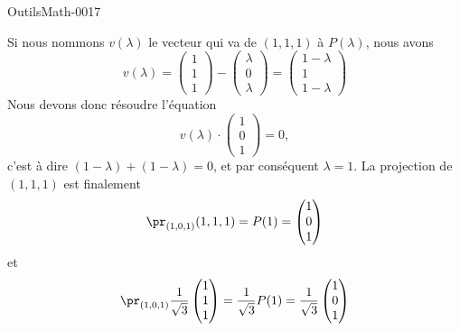 \begin{corrige}{OutilsMath-0017}
	
	Si nous nommons $v(\lambda)$ le vecteur qui va de $(1,1,1)$ à $P(\lambda)$, nous avons
	\begin{equation}
		v(\lambda)=\begin{pmatrix}
			1	\\ 
			1	\\ 
			1	
		\end{pmatrix}-\begin{pmatrix}
			\lambda	\\ 
			0	\\ 
			\lambda	
		\end{pmatrix}=\begin{pmatrix}
			1-\lambda	\\ 
			1	\\ 
			1-\lambda	
		\end{pmatrix}
	\end{equation}
	Nous devons donc résoudre l'équation
	\begin{equation}
		v(\lambda)\cdot\begin{pmatrix}
			1	\\ 
			0	\\ 
			1	
		\end{pmatrix}=0,
	\end{equation}
	c'est à dire $(1-\lambda)+(1-\lambda)=0$, et par conséquent $\lambda=1$. La projection de \( (1,1,1)\) est finalement
	\begin{equation}
		\pr_{(1,0,1)}(1,1,1)=P(1)=\begin{pmatrix}
			1	\\ 
			0	\\ 
			1	
		\end{pmatrix}
	\end{equation}
    et
	\begin{equation}
        \pr_{(1,0,1)}\frac{1}{ \sqrt{3} }\begin{pmatrix}
            1    \\ 
            1    \\ 
            1    
        \end{pmatrix}=\frac{1}{ \sqrt{3} }P(1)=\frac{1}{ \sqrt{3} }\begin{pmatrix}
			1	\\ 
			0	\\ 
			1	
		\end{pmatrix}
	\end{equation}

\end{corrige}
